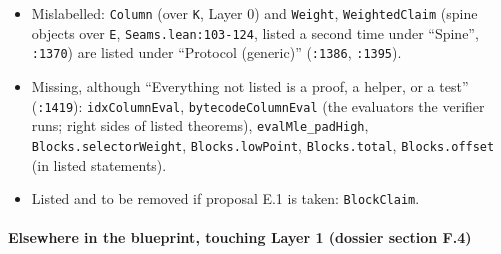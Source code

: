 \begin{itemize}
\item Mislabelled: \texttt{Column} (over \texttt{K}, Layer 0) and \texttt{Weight}, \texttt{WeightedClaim} (spine objects over \texttt{E}, \texttt{Seams.\allowbreak{}lean:103-{}124}, listed a second time under \enquote{Spine}, \texttt{:1370}) are listed under \enquote{Protocol (generic)} (\texttt{:1386}, \texttt{:1395}).
\item Missing, although \enquote{Everything not listed is a proof, a helper, or a test} (\texttt{:1419}): \texttt{idxColumnEval}, \texttt{bytecodeColumnEval} (the evaluators the verifier runs; right sides of listed theorems), \texttt{evalMle\_\allowbreak{}padHigh}, \texttt{Blocks.\allowbreak{}selectorWeight}, \texttt{Blocks.\allowbreak{}lowPoint}, \texttt{Blocks.\allowbreak{}total}, \texttt{Blocks.\allowbreak{}offset} (in listed statements).
\item Listed and to be removed if proposal E.1 is taken: \texttt{BlockClaim}.
\end{itemize}

\paragraph{Elsewhere in the blueprint, touching Layer 1 (dossier section F.4)}\label{sec:gen-layer1-F4}

